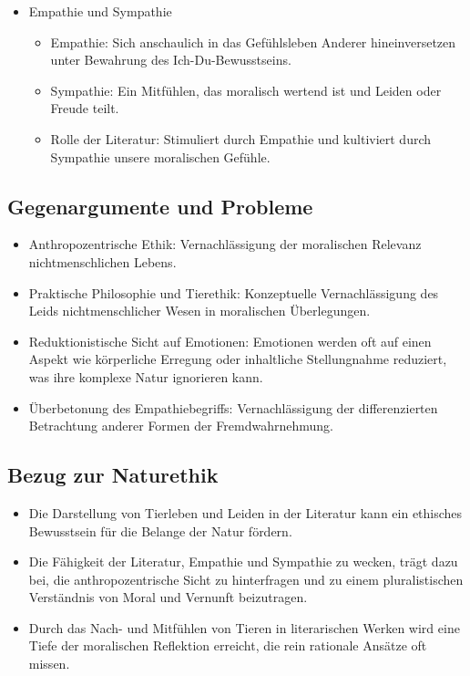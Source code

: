 \documentclass{article}
\begin{document}
\begin{itemize}
	\item Empathie und Sympathie
	      \begin{itemize}
		      \item Empathie: Sich anschaulich in das Gefühlsleben Anderer hineinversetzen unter Bewahrung des Ich-Du-Bewusstseins.
		      \item Sympathie: Ein Mitfühlen, das moralisch wertend ist und Leiden oder Freude teilt.
		      \item Rolle der Literatur: Stimuliert durch Empathie und kultiviert durch Sympathie unsere moralischen Gefühle.
	      \end{itemize}

\end{itemize}

\subsection*{Gegenargumente und Probleme}
\begin{itemize}
	\item Anthropozentrische Ethik: Vernachlässigung der moralischen Relevanz nichtmenschlichen Lebens.
	\item Praktische Philosophie und Tierethik: Konzeptuelle Vernachlässigung des Leids nichtmenschlicher Wesen in moralischen Überlegungen.
	\item Reduktionistische Sicht auf Emotionen: Emotionen werden oft auf einen Aspekt wie körperliche Erregung oder inhaltliche Stellungnahme reduziert, was ihre komplexe Natur ignorieren kann.
	\item Überbetonung des Empathiebegriffs: Vernachlässigung der differenzierten Betrachtung anderer Formen der Fremdwahrnehmung.
\end{itemize}

\subsection*{Bezug zur Naturethik}
\begin{itemize}
	\item Die Darstellung von Tierleben und Leiden in der Literatur kann ein ethisches Bewusstsein für die Belange der Natur fördern.
	\item Die Fähigkeit der Literatur, Empathie und Sympathie zu wecken, trägt dazu bei, die anthropozentrische Sicht zu hinterfragen und zu einem pluralistischen Verständnis von Moral und Vernunft beizutragen.
	\item Durch das Nach- und Mitfühlen von Tieren in literarischen Werken wird eine Tiefe der moralischen Reflektion erreicht, die rein rationale Ansätze oft missen.
\end{itemize}
\end{document}
